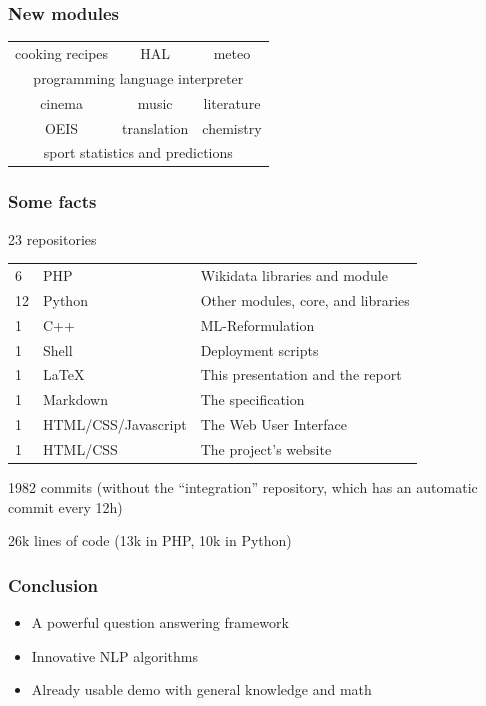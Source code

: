 \begin{frame}[fragile]
    \frametitle{New modules}
    \begin{table}
    \Large
    \centering
    \begin{tabular}{ccc}
        \textcolor{mLightBrown}{cooking recipes} & \textcolor{mDarkBrown}{HAL} & \textcolor{mMediumBrown}{meteo} \\
        \multicolumn{3}{c}{\textcolor{mDarkTeal}{programming language interpreter}} \\
        \textcolor{mMediumBrown}{cinema} & \textcolor{mDarkTeal}{music} & \textcolor{mLightBrown}{literature}\\
        \textcolor{mDarkBrown}{OEIS} & \textcolor{mLightBrown}{translation} & \textcolor{mDarkTeal}{chemistry}\\
        \multicolumn{3}{c}{\textcolor{mMediumBrown}{sport statistics and predictions}} \\
    \end{tabular}
    \end{table}
\end{frame}

\begin{frame}[fragile]
    \frametitle{Some facts} %
    \alert{23 repositories}

    \begin{tabular}{lll}
        6 & PHP & Wikidata libraries and module\\
        12 & Python & Other modules, core, and libraries\\
        1 & C++ & ML-Reformulation\\
        1 & Shell & Deployment scripts\\
        1 & \LaTeX & This presentation and the report\\
        1 & Markdown & The specification\\
        1 & HTML/CSS/Javascript & The Web User Interface\\
        1 & HTML/CSS & The project's website\\
    \end{tabular}

    \alert{1982 commits} (without the ``integration'' repository, which has an automatic commit every 12h)

    \alert{26k lines} of code (13k in PHP, 10k in Python)
\end{frame}

\begin{frame}
    \frametitle{Conclusion}

    \begin{itemize}
        \item A powerful question answering framework
        \item Innovative NLP algorithms
        \item Already usable demo with general knowledge and math
    \end{itemize}
\end{frame}


